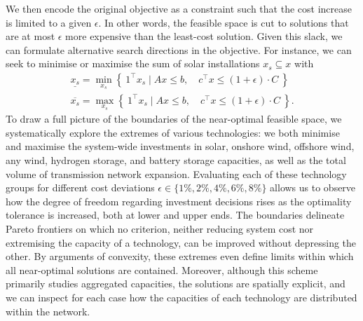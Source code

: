 We then encode the original objective as a constraint
such that the cost increase is limited to a given $\epsilon$.
In other words, the feasible space is cut to solutions that
are at most $\epsilon$ more expensive than the least-cost solution.
Given this slack, we can formulate alternative search directions in the objective.
For instance, we can seek to minimise or maximise the sum of solar installations $x_s \subseteq x$ with
\begin{align}
    \label{eq:xs_max}
    \underline{x_s} = \min_{x_s}\left\{\: 1^\top x_s \mid Ax\leq b,\quad c^\top x\leq (1+\epsilon)\cdot C \:\right\} \\
    \label{eq:xs_min}
    \overline{x_s} = \max_{x_s}\left\{\: 1^\top x_s \mid Ax\leq b,\quad c^\top x\leq (1+\epsilon)\cdot C \:\right\}.
\end{align}
To draw a full picture of the boundaries of the near-optimal feasible space,
we systematically explore the extremes of various technologies:
we both minimise and maximise the system-wide investments in
solar, onshore wind, offshore wind, any wind, hydrogen storage, and battery storage
capacities, as well as the total volume of transmission network expansion.
Evaluating each of these technology groups for
different cost deviations $\epsilon \in \{1\%,2\%,4\%,6\%,8\%\}$
allows us to observe how the degree of freedom regarding investment decisions
rises as the optimality tolerance is increased, both at lower and upper ends.
The boundaries delineate Pareto frontiers on which no criterion,
neither reducing system cost nor extremising the capacity of a technology,
can be improved without depressing the other.
By arguments of convexity, these extremes even define limits
within which all near-optimal solutions are contained.
Moreover, although this scheme primarily studies aggregated capacities,
the solutions are spatially explicit, and we can inspect for each case
how the capacities of each technology are distributed within the network.



